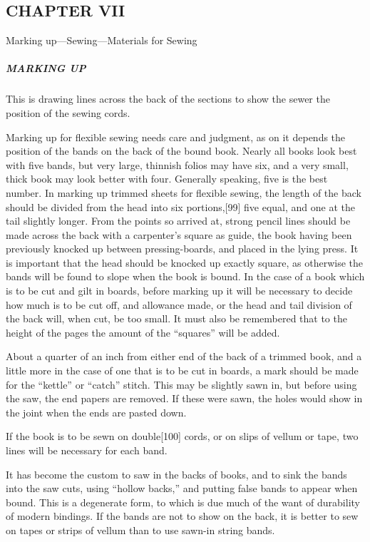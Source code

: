 \documentclass[
]{article}
\begin{document}
\hypertarget{chapter-vii}{%
\subsection[CHAPTER
VII]{\texorpdfstring{\protect\hypertarget{CHAPTER_VII}{}{}CHAPTER
VII}{CHAPTER VII}}\label{chapter-vii}}

Marking up---Sewing---Materials for Sewing

\hypertarget{marking-up}{%
\subparagraph{MARKING UP}\label{marking-up}}

{This} is drawing lines across the back of the sections to show the
sewer the position of the sewing cords.

Marking up for flexible sewing needs care and judgment, as on it depends
the position of the bands on the back of the bound book. Nearly all
books look best with five bands, but very large, thinnish folios may
have six, and a very small, thick book may look better with four.
Generally speaking, five is the best number. In marking up trimmed
sheets for flexible sewing, the length of the back should be divided
from the head into six
portions,{\protect\hypertarget{Page_99}{}{{[}99{]}}} five equal, and one
at the tail slightly longer. From the points so arrived at, strong
pencil lines should be made across the back with a carpenter's square as
guide, the book having been previously knocked up between
pressing-boards, and placed in the lying press. It is important that the
head should be knocked up exactly square, as otherwise the bands will be
found to slope when the book is bound. In the case of a book which is to
be cut and gilt in boards, before marking up it will be necessary to
decide how much is to be cut off, and allowance made, or the head and
tail division of the back will, when cut, be too small. It must also be
remembered that to the height of the pages the amount of the ``squares''
will be added.

About a quarter of an inch from either end of the back of a trimmed
book, and a little more in the case of one that is to be cut in boards,
a mark should be made for the ``kettle'' or ``catch'' stitch. This may
be slightly sawn in, but before using the saw, the end papers are
removed. If these were sawn, the holes would show in the joint when the
ends are pasted down.

If the book is to be sewn on
double{\protect\hypertarget{Page_100}{}{{[}100{]}}} cords, or on slips
of vellum or tape, two lines will be necessary for each band.

It has become the custom to saw in the backs of books, and to sink the
bands into the saw cuts, using ``hollow backs,'' and putting false bands
to appear when bound. This is a degenerate form, to which is due much of
the want of durability of modern bindings. If the bands are not to show
on the back, it is better to sew on tapes or strips of vellum than to
use sawn-in string bands.
\end{document}
